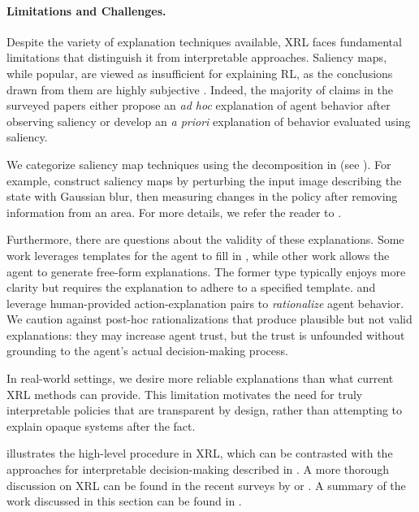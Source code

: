 \paragraph{Limitations and Challenges.}
Despite the variety of explanation techniques available, XRL faces fundamental limitations that distinguish it from interpretable approaches. Saliency maps, while popular, are viewed as insufficient for explaining RL, as the conclusions drawn from them are highly subjective \cite{atrey2019exploratory}. Indeed, the majority of claims in the surveyed papers either propose an \textit{ad hoc} explanation of agent behavior after observing saliency or develop an \textit{a priori} explanation of behavior evaluated using saliency.

We categorize saliency map techniques using the decomposition in \cite{atrey2019exploratory} (see ). For example, \cite{greydanus2018visualizing} construct saliency maps by perturbing the input image describing the state with Gaussian blur, then measuring changes in the policy after removing information from an area. For more details, we refer the reader to \cite{atrey2019exploratory}.

Furthermore, there are questions about the validity of these explanations. Some work leverages templates for the agent to fill in \cite{ImpRoboticController}, while other work allows the agent to generate free-form explanations. The former type typically enjoys more clarity but requires the explanation to adhere to a specified template. \cite{frogger} and \cite{wang2019verbalexplanations} leverage human-provided action-explanation pairs to \textit{rationalize} agent behavior. We caution against post-hoc rationalizations that produce plausible but not valid explanations: they may increase agent trust, but the trust is unfounded without grounding to the agent's actual decision-making process.

In real-world settings, we desire more reliable explanations than what current XRL methods can provide. This limitation motivates the need for truly interpretable policies that are transparent by design, rather than attempting to explain opaque systems after the fact.

 illustrates the high-level procedure in XRL, which can be contrasted with the approaches for interpretable decision-making described in . A more thorough discussion on XRL can be found in the recent surveys by \cite{alharin_reinforcement_2020} or \cite{heuillet_explainability_2021}. A summary of the work discussed in this section can be found in .

